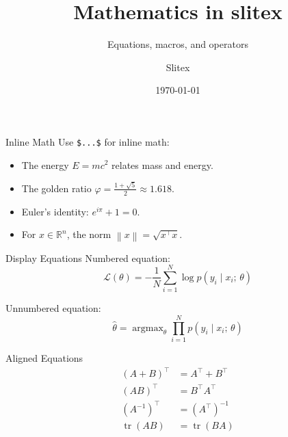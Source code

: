\documentclass[aspectratio=169]{beamer}
\title{Mathematics in slitex}
\subtitle{Equations, macros, and operators}
\author{Slitex}
\date{\today}
\newcommand{\R}{\mathbb{R}}
\newcommand{\norm}[1]{\left\lVert #1 \right\rVert}
\DeclareMathOperator{\tr}{tr}
\DeclareMathOperator*{\argmax}{argmax}
\begin{document}
\begin{frame}
  \titlepage
\end{frame}


\begin{frame}{Inline Math}
  Use \texttt{\$...\$} for inline math:

  \begin{itemize}
    \item The energy $E = mc^2$ relates mass and energy.
    \item The golden ratio $\varphi = \frac{1 + \sqrt{5}}{2} \approx 1.618$.
    \item Euler's identity: $e^{i\pi} + 1 = 0$.
    \item For $x \in \R^n$, the norm $\norm{x} = \sqrt{x^\top x}$.
  \end{itemize}
\end{frame}


\begin{frame}{Display Equations}
  Numbered equation:
  \begin{equation}
    \mathcal{L}(\theta) = -\frac{1}{N} \sum_{i=1}^{N} \log p(y_i \mid x_i;\, \theta)
  \end{equation}

  Unnumbered equation:
  \begin{equation*}
    \hat{\theta} = \argmax_{\theta} \prod_{i=1}^{N} p(y_i \mid x_i;\, \theta)
  \end{equation*}
\end{frame}


\begin{frame}{Aligned Equations}
  \begin{align}
    (A + B)^\top  &= A^\top + B^\top       \\
    (AB)^\top     &= B^\top A^\top         \\
    (A^{-1})^\top &= (A^\top)^{-1}         \\
    \tr(AB)       &= \tr(BA)
  \end{align}
\end{frame}

\end{document}
